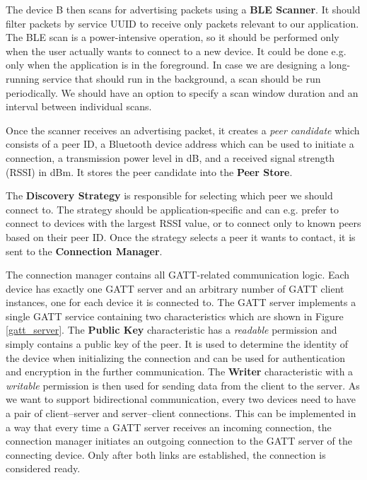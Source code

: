 The device B then scans for advertising packets using a \textbf{BLE Scanner}. It should filter packets by service UUID to receive only packets relevant to our application. The BLE scan is a power-intensive operation, so it should be performed only when the user actually wants to connect to a new device. It could be done e.g. only when the application is in the foreground. In case we are designing a long-running service that should run in the background, a scan should be run periodically. We should have an option to specify a scan window duration and an interval between individual scans.

Once the scanner receives an advertising packet, it creates a \textit{peer candidate} which consists of a peer ID, a Bluetooth device address which can be used to initiate a connection, a transmission power level in dB, and a received signal strength (RSSI) in dBm. It stores the peer candidate into the \textbf{Peer Store}.

The \textbf{Discovery Strategy} is responsible for selecting which peer we should connect to. The strategy should be application-specific and can e.g. prefer to connect to devices with the largest RSSI value, or to connect only to known peers based on their peer ID. Once the strategy selects a peer it wants to contact, it is sent to the \textbf{Connection Manager}.

The connection manager contains all GATT-related communication logic. Each device has exactly one GATT server and an arbitrary number of GATT client instances, one for each device it is connected to. The GATT server implements a single GATT service containing two characteristics which are shown in Figure \ref{gatt_server}. The \textbf{Public Key} characteristic has a \textit{readable} permission and simply contains a public key of the peer. It is used to determine the identity of the device when initializing the connection and can be used for authentication and encryption in the further communication. The \textbf{Writer} characteristic with a \textit{writable} permission is then used for sending data from the client to the server. As we want to support bidirectional communication, every two devices need to have a pair of client–server and server–client connections. This can be implemented in a way that every time a GATT server receives an incoming connection, the connection manager initiates an outgoing connection to the GATT server of the connecting device. Only after both links are established, the connection is considered ready.

